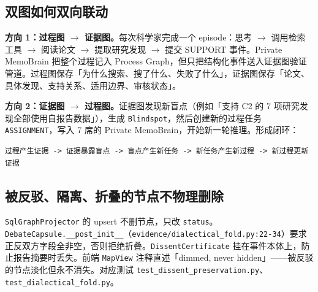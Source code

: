 \subsection{双图如何双向联动}

\textbf{方向 1：过程图 $\rightarrow$ 证据图。}每次科学家完成一个 episode：思考 $\rightarrow$ 调用检索工具 $\rightarrow$ 阅读论文 $\rightarrow$ 提取研究发现 $\rightarrow$ 提交 SUPPORT 事件。Private MemoBrain 把整个过程记入 Process Graph，但只把结构化事件送入证据图验证管道。过程图保存「为什么搜索、搜了什么、失败了什么」，证据图保存「论文、具体发现、支持关系、适用边界、审核状态」。

\textbf{方向 2：证据图 $\rightarrow$ 过程图。}证据图发现新盲点（例如「支持 C2 的 7 项研究发现全部使用自报告数据」），生成 \texttt{Blindspot}，然后创建新的过程任务 \texttt{ASSIGNMENT}，写入 7 席的 Private MemoBrain，开始新一轮推理。形成闭环：

\begin{lstlisting}
过程产生证据 -> 证据暴露盲点 -> 盲点产生新任务 -> 新任务产生新过程 -> 新过程更新证据
\end{lstlisting}

\subsection{被反驳、隔离、折叠的节点不物理删除}

\texttt{SqlGraphProjector} 的 upsert 不删节点，只改 \texttt{status}。\texttt{DebateCapsule.\_\_post\_init\_\_}（\texttt{evidence/dialectical\_fold.py:22-34}）要求正反双方字段全非空，否则拒绝折叠。\texttt{DissentCertificate} 挂在事件本体上，防止报告摘要时丢失。前端 \texttt{MapView} 注释直述「dimmed, never hidden」——被反驳的节点淡化但永不消失。对应测试 \texttt{test\_dissent\_preservation.py}、\texttt{test\_dialectical\_fold.py}。
